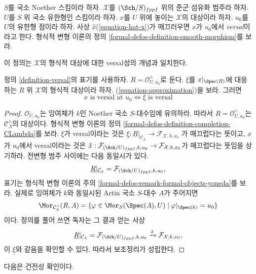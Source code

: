 \begin{definition}
\label{definition-versal}
$S$를 국소 Noether 스킴이라 하자.
$\mathcal{X}$를 $(\Sch/S)_{fppf}$ 위의 준군 섬유화 범주라 하자.
$U$를 $S$ 위 국소 유한형인 스킴이라 하자.
$x$를 $U$ 위에 놓이는 $\mathcal{X}$의 대상이라 하자.
$u_0$를 $U$의 유한형 점이라 하자.
사상 $\hat x$(\ref{equation-hat-x})가 매끄러우면 $x$가 $u_0$에서
{\it versal}이라고 한다. 형식적 변형 이론의
정의 \ref{formal-defos-definition-smooth-morphism}를 보라.
\end{definition}

\noindent
이 정의는 $\mathcal{X}$의 형식적 대상에 대한 versal성의 개념과 일치한다.

\begin{lemma}
\label{lemma-versality-matches}
정의 \ref{definition-versal}의 표기를 사용하자.
$R = \mathcal{O}_{U, u_0}^\wedge$로 둔다.
$\xi$를 $x|_{\Spec(R)}$에 대응하는 $R$ 위 $\mathcal{X}$의 형식적
대상이라 하자. (\ref{equation-approximation})을 보라. 그러면
$$
x\text{ is versal at }u_0
\Leftrightarrow
\xi\text{ is versal}
$$
\end{lemma}

\begin{proof}
$\mathcal{O}_{U, u_0}$는 잉여체가 $k$인 Noether 국소 $S$-대수임에
유의하라. 따라서 $R = \mathcal{O}_{U, u_0}^\wedge$는
$\mathcal{C}_\Lambda^\wedge$의 대상이다. 형식적 변형 이론의
정의 \ref{formal-defos-definition-completion-CLambda}를 보라.
$\xi$가 versal이라는 것은
$\underline{\xi} : \underline{R}|_{\mathcal{C}_\Lambda} \to
\mathcal{F}_{\mathcal{X}, k, x_0}$
가 매끄럽다는 뜻이고, $x$가 $u_0$에서 versal이라는 것은
$\hat x : \mathcal{F}_{(\Sch/U)_{fppf}, k, u_0}
\to \mathcal{F}_{\mathcal{X}, k, x_0}$가 매끄럽다는 뜻임을 상기하라.
전변형 범주 사이에는 다음 동일시가 있다.
$$
\underline{R}|_{\mathcal{C}_\Lambda}
=
\mathcal{F}_{(\Sch/U)_{fppf}, k, u_0},
$$
표기는 형식적 변형 이론의
주의 \ref{formal-defos-remark-formal-objects-yoneda}를 보라.
실제로 잉여체가 $k$와 동일시된 Artin 국소 $S$-대수 $A$가 주어지면
$$
\Mor_{\mathcal{C}_\Lambda^\wedge}(R, A) =
\{\varphi \in \Mor_S(\Spec(A), U) \mid \varphi|_{\Spec(k)} = u_0\}
$$
이다. 정의를 풀어 쓰면 독자는 그 결과 얻는 사상
$$
\underline{R}|_{\mathcal{C}_\Lambda} =
\mathcal{F}_{(\Sch/U)_{fppf}, k, u_0}
\xrightarrow{\hat x}
\mathcal{F}_{\mathcal{X}, k, x_0},
$$
이 $\underline{\xi}$와 같음을 확인할 수 있다. 따라서 보조정리가 성립한다.
\end{proof}

\noindent
다음은 건전성 확인이다.

